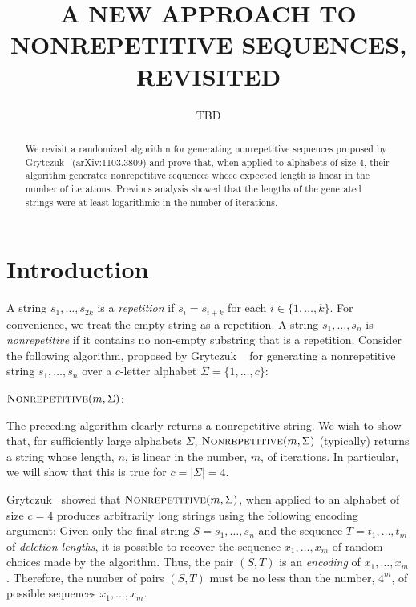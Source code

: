 \documentclass{patmorin}
\title{\MakeUppercase{A New Approach to Nonrepetitive Sequences, Revisited}}
\author{TBD}
\begin{document}
\maketitle

\begin{abstract}
  We revisit a randomized algorithm for generating nonrepetitive sequences proposed by Grytczuk \etal\ (arXiv:1103.3809) and prove that, when applied to alphabets of size 4, their algorithm generates nonrepetitive sequences whose expected length is linear in the number of iterations. Previous analysis showed that the lengths of the generated strings were at least logarithmic in the number of iterations.
\end{abstract}

\section{Introduction}

A string $s_1,\ldots,s_{2k}$ is a \emph{repetition} if $s_i=s_{i+k}$ for each $i\in\{1,\ldots,k\}$.  For convenience, we treat the empty string as a repetition.  A string $s_1,\ldots,s_n$ is \emph{nonrepetitive} if it contains no non-empty substring that is a repetition.  Consider the following algorithm, proposed by Grytczuk \etal\ \cite{grytczuk.xxx.ea:new} for generating a nonrepetitive string $s_1,\ldots,s_n$ over a $c$-letter alphabet $\Sigma=\{1,\ldots,c\}$:

\noindent$\textsc{Nonrepetitive}(m,\Sigma)$:
\begin{algorithmic}[1]
  \ENDFOR
\end{algorithmic}

The preceding algorithm clearly returns a nonrepetitive string.  We wish to show that, for sufficiently large alphabets $\Sigma$, $\textsc{Nonrepetitive}(m,\Sigma)$ (typically) returns a string whose length, $n$, is linear in the number, $m$, of iterations.  In particular, we will show that this is true for $c=|\Sigma|=4$.

Grytczuk \etal\ showed that $\textsc{Nonrepetitive}(m,\Sigma)$, when applied to an alphabet of size $c=4$ produces arbitrarily long strings using the following encoding argument:  Given only the final string $S=s_1,\ldots,s_n$ and the sequence $T=t_1,\ldots,t_m$ of \emph{deletion lengths}, it is possible to recover the sequence $x_1,\ldots,x_m$ of random choices made by the algorithm.  Thus, the pair $(S,T)$ is an \emph{encoding} of $x_1,\ldots,x_m$. Therefore, the number of pairs $(S,T)$ must be no less than the number, $4^m$, of possible sequences $x_1,\ldots,x_m$.  
\end{document}
